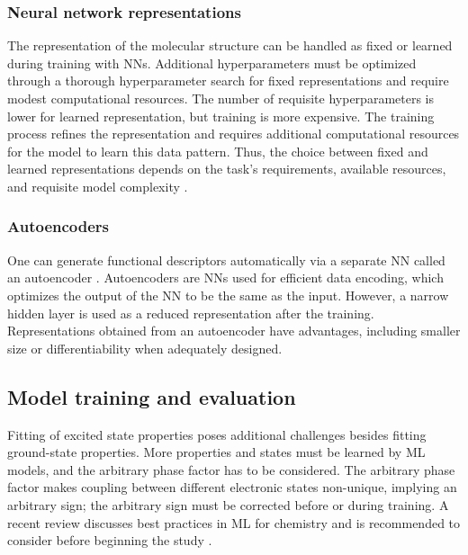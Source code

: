 \documentclass[9pt,bestpractices]{livecoms}
\begin{document}
\subsubsection{Neural network representations}
\label{sec:nnrep}
The representation of the molecular structure can be handled as fixed or learned during training with NNs. Additional hyperparameters must be optimized through a thorough hyperparameter search for fixed representations and require modest computational resources. The number of requisite hyperparameters is lower for learned representation, but training is more expensive. The training process refines the representation and requires additional computational resources for the model to learn this data pattern. Thus, the choice between fixed and learned representations depends on the task's requirements, available resources, and requisite model complexity \cite{RN98}.

\subsubsection{Autoencoders}

One can generate functional descriptors automatically via a separate NN called an autoencoder \cite{RN145}. Autoencoders are NNs used for efficient data encoding, which optimizes the output of the NN to be the same as the input. However, a narrow hidden layer is used as a reduced representation after the training. Representations obtained from an autoencoder have advantages, including smaller size or differentiability when adequately designed. 

\subsection{Model training and evaluation}
\label{sec:modeltrain}
Fitting of excited state properties poses additional challenges besides fitting ground-state properties. More properties and states must be learned by ML models, and the arbitrary phase factor has to be considered. The arbitrary phase factor makes coupling between different electronic states non-unique, implying an arbitrary sign; the arbitrary sign must be corrected before or during training. A recent review discusses best practices in ML for chemistry and is recommended to consider before beginning the study \cite{RN28}.
\end{document}
